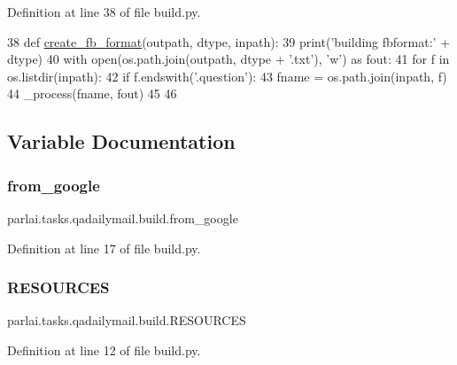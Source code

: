 Definition at line 38 of file build.\+py.


\begin{DoxyCode}
38 \textcolor{keyword}{def }\hyperlink{namespaceparlai_1_1tasks_1_1wikiqa_1_1build_a554828702769592403db58c955d1dfe3}{create\_fb\_format}(outpath, dtype, inpath):
39     print(\textcolor{stringliteral}{'building fbformat:'} + dtype)
40     with open(os.path.join(outpath, dtype + \textcolor{stringliteral}{'.txt'}), \textcolor{stringliteral}{'w'}) \textcolor{keyword}{as} fout:
41         \textcolor{keywordflow}{for} f \textcolor{keywordflow}{in} os.listdir(inpath):
42             \textcolor{keywordflow}{if} f.endswith(\textcolor{stringliteral}{'.question'}):
43                 fname = os.path.join(inpath, f)
44                 \_process(fname, fout)
45 
46 
\end{DoxyCode}


\subsection{Variable Documentation}
\mbox{\label{namespaceparlai_1_1tasks_1_1qadailymail_1_1build_a9fd39fbb47a4bd1849df9453114fe00e}} 
\subsubsection{\texorpdfstring{from\+\_\+google}{from\_google}}
{\footnotesize\ttfamily parlai.\+tasks.\+qadailymail.\+build.\+from\+\_\+google}



Definition at line 17 of file build.\+py.

\mbox{\label{namespaceparlai_1_1tasks_1_1qadailymail_1_1build_a02ef3b1091c6cd3ab59d22b37d31ebf9}} 
\subsubsection{\texorpdfstring{R\+E\+S\+O\+U\+R\+C\+ES}{RESOURCES}}
{\footnotesize\ttfamily parlai.\+tasks.\+qadailymail.\+build.\+R\+E\+S\+O\+U\+R\+C\+ES}



Definition at line 12 of file build.\+py.

